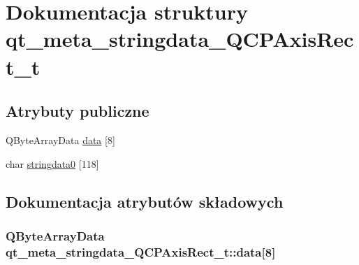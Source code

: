 \hypertarget{structqt__meta__stringdata___q_c_p_axis_rect__t}{}\section{Dokumentacja struktury qt\+\_\+meta\+\_\+stringdata\+\_\+\+Q\+C\+P\+Axis\+Rect\+\_\+t}
\label{structqt__meta__stringdata___q_c_p_axis_rect__t}
\subsection*{Atrybuty publiczne}
\begin{DoxyCompactItemize}
\item 
Q\+Byte\+Array\+Data \hyperlink{structqt__meta__stringdata___q_c_p_axis_rect__t_abe371091541ce1b738a7026d4387d5b2}{data} \mbox{[}8\mbox{]}
\item 
char \hyperlink{structqt__meta__stringdata___q_c_p_axis_rect__t_a7263fed0445758459e2610e1b9fffe05}{stringdata0} \mbox{[}118\mbox{]}
\end{DoxyCompactItemize}


\subsection{Dokumentacja atrybutów składowych}
\subsubsection[{\texorpdfstring{data}{data}}]{\setlength{\rightskip}{0pt plus 5cm}Q\+Byte\+Array\+Data qt\+\_\+meta\+\_\+stringdata\+\_\+\+Q\+C\+P\+Axis\+Rect\+\_\+t\+::data\mbox{[}8\mbox{]}}\hypertarget{structqt__meta__stringdata___q_c_p_axis_rect__t_abe371091541ce1b738a7026d4387d5b2}{}\label{structqt__meta__stringdata___q_c_p_axis_rect__t_abe371091541ce1b738a7026d4387d5b2}

